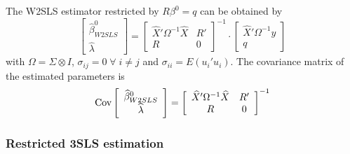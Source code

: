 The W2SLS estimator restricted by $R \beta^0 = q$ can be obtained by
\begin{equation}
   \left[ \begin{array}{c}
      \widehat{\beta}^0_{W2SLS} \\ \widehat{\lambda}
   \end{array} \right]
   =
   \left[ \begin{array}{cc}
      \widehat{X}' \Omega^{-1} \widehat{X} & R' \\ 
      R & 0
   \end{array} \right]^{-1}
   \cdot
   \left[ \begin{array}{c}
      \widehat{X}' \Omega^{-1} y \\ q 
   \end{array} \right]
\end{equation}
with $\Omega = \Sigma \otimes I$, 
$\sigma_{ij} = 0 \; \forall \; i \neq j$ and
$\sigma_{ii} = E \left( u_i' u_i \right)$.
The covariance matrix of the estimated parameters is
\begin{equation}
   \text{Cov} 
   \left[ \begin{array}{c}
      \widehat{\beta}^0_{W2SLS} \\ \widehat{\lambda}
   \end{array} \right] 
   = 
   \left[ \begin{array}{cc}
      \widehat{X}' \Omega^{-1} \widehat{X} & R' \\ 
      R & 0
   \end{array} \right]^{-1}
\end{equation}


\subsubsection{Restricted 3SLS estimation}


